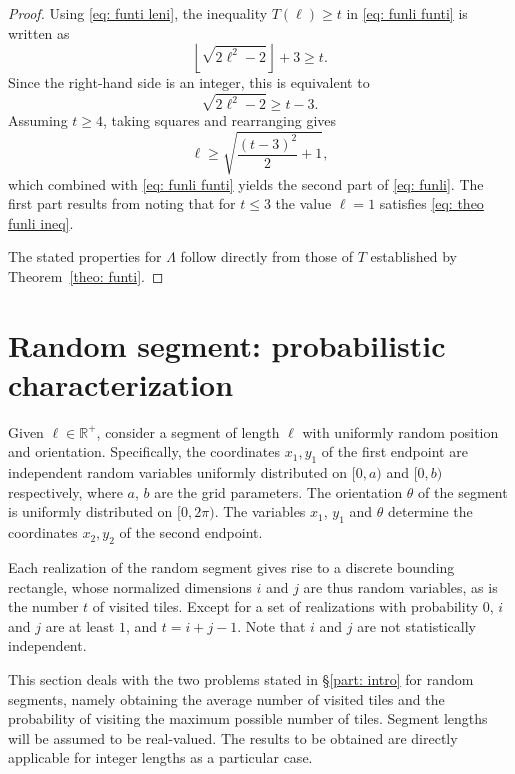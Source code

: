\documentclass[12pt, a4paper]{article}
\newcommand{\funti}{T} %
\newcommand{\funli}{\Lambda} %
\newcommand{\len}{\ell} %
\newcommand{\leni}{\ell} %
\newcommand{\tiles}{t} %
\begin{document}
\begin{proof}
Using \eqref{eq: funti leni}, the inequality $\funti(\leni) \geq \tiles$ in \eqref{eq: funli funti} is written as
\begin{equation}
\left\lfloor \sqrt{2\leni^2-2} \right\rfloor + 3 \geq \tiles.
\end{equation}
Since the right-hand side is an integer, this is equivalent to
\begin{equation}
\label{eq: theo funli ineq}
\sqrt{2\leni^2-2} \geq \tiles-3.
\end{equation}
Assuming $\tiles \geq 4$, taking squares and rearranging gives
\begin{equation}
\leni \geq \sqrt{\frac{(\tiles-3)^2} 2 + 1},
\end{equation}
which combined with \eqref{eq: funli funti} yields the second part of \eqref{eq: funli}. The first part results from noting that for $\tiles \leq 3$ the value $\leni=1$ satisfies \eqref{eq: theo funli ineq}.

The stated properties for $\funli$ follow directly from those of $\funti$ established by Theorem~\ref{theo: funti}.
\end{proof}


\section{Random segment: probabilistic characterization}
\label{part: rand}

Given $\len \in \mathbb R^+$, consider a segment of length $\len$ with uniformly random position and orientation. Specifically, the coordinates $x_1, y_1$ of the first endpoint are independent random variables uniformly distributed on $[0,a)$ and $[0,b)$ respectively, where $a$, $b$ are the grid parameters. The orientation $\theta$ of the segment is uniformly distributed on $[0,2\pi)$. The variables $x_1$, $y_1$ and $\theta$ determine the coordinates $x_2, y_2$ of the second endpoint.

Each realization of the random segment gives rise to a discrete bounding rectangle, whose normalized dimensions $i$ and $j$ are thus random variables, as is the number $\tiles$ of visited tiles. Except for a set of realizations with probability $0$, $i$ and $j$ are at least $1$, and $\tiles = i+j-1$. Note that $i$ and $j$ are not statistically independent.

This section deals with the two problems stated in \S\ref{part: intro} for random segments, namely obtaining the average number of visited tiles and the probability of visiting the maximum possible number of tiles. Segment lengths will be assumed to be real-valued. The results to be obtained are directly applicable for integer lengths as a particular case.
\end{document}
